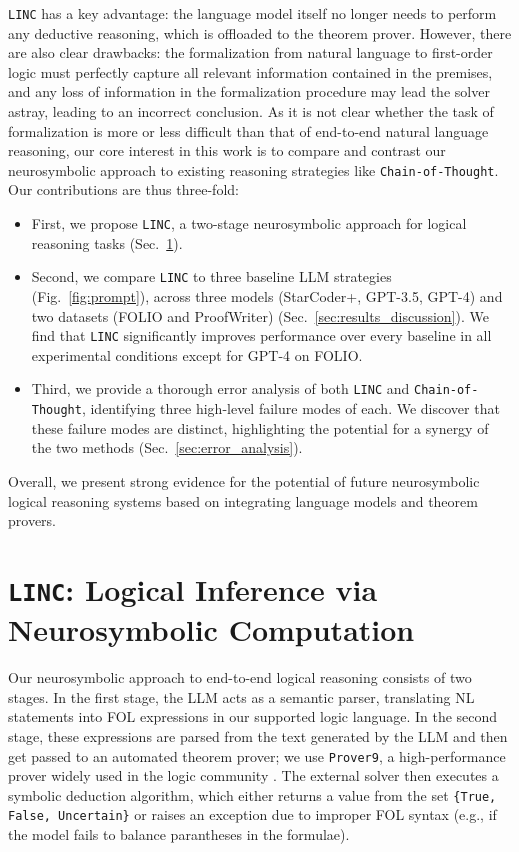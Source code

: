 \documentclass[11pt]{article}
\begin{document}
\texttt{LINC} has a key advantage: the language model itself no longer needs to perform any deductive reasoning, which is offloaded to the theorem prover. However, there are also clear drawbacks: the formalization from natural language to first-order logic must perfectly capture all relevant information contained in the premises, and any loss of information in the formalization procedure may lead the solver astray, leading to an incorrect conclusion.
As it is not clear whether the task of formalization is more or less difficult than that of end-to-end natural language reasoning, our core interest in this work is to compare and contrast our neurosymbolic approach to existing reasoning strategies like \texttt{Chain-of-Thought}. Our contributions are thus three-fold:
\begin{itemize}
\item First, we propose \texttt{LINC}, a two-stage neurosymbolic approach for logical reasoning tasks (Sec.~\ref{sec:ns-model}).

\item Second, we compare \texttt{LINC} to three baseline LLM strategies (Fig.~\ref{fig:prompt}), across three models (StarCoder+, GPT-3.5, GPT-4) and two datasets (FOLIO and ProofWriter) (Sec.~\ref{sec:results_discussion}). We find that \texttt{LINC} significantly improves performance over every baseline in all experimental conditions except for GPT-4 on FOLIO.
\item Third, we provide a thorough error analysis of both \texttt{LINC} and \texttt{Chain-of-Thought}, identifying three high-level failure modes of each. We discover that these failure modes are distinct, highlighting the potential for a synergy of the two methods (Sec.~\ref{sec:error_analysis}).
\end{itemize}
Overall, we present strong evidence for the potential of future neurosymbolic logical reasoning systems based on integrating language models and theorem provers.

\section{\texttt{LINC}: Logical Inference via Neurosymbolic Computation}
\label{sec:ns-model}


Our neurosymbolic approach to end-to-end logical reasoning consists of two stages. In the first stage, the LLM acts as a semantic parser, translating NL statements into FOL expressions in our supported logic language.
In the second stage, these expressions are parsed from the text generated by the LLM and then get passed to an automated theorem prover; we use \texttt{Prover9}, a high-performance prover widely used in the logic community \citep{prover9-mace4}.
The external solver then executes a symbolic deduction algorithm, which either returns a value from the set \texttt{\{True, \texttt{False}, Uncertain\}} or raises an exception due to improper FOL syntax (e.g., if the model fails to balance parantheses in the formulae).
\end{document}

